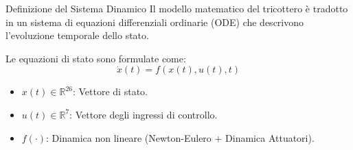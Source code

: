 \documentclass[aspectratio=169]{beamer} %
\begin{document}
\begin{frame}{Definizione del Sistema Dinamico}
    Il modello matematico del tricottero è tradotto in un sistema di equazioni differenziali ordinarie (ODE) che descrivono l'evoluzione temporale dello stato.
    
    \vspace{1em}
    
    Le equazioni di stato sono formulate come:
    \begin{equation}
        \dot{x}(t) = f(x(t), u(t), t)
    \end{equation}
    
    \begin{itemize}
        \item $x(t) \in \mathbb{R}^{26}$: Vettore di stato.
        \item $u(t) \in \mathbb{R}^{7}$: Vettore degli ingressi di controllo.
        \item $f(\cdot)$: Dinamica non lineare (Newton-Eulero + Dinamica Attuatori).
    \end{itemize}
\end{frame}
\end{document}
